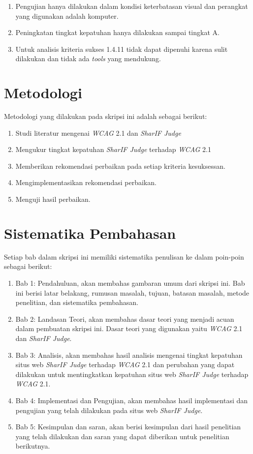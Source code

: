 \begin{enumerate}
	\item Pengujian hanya dilakukan dalam kondisi keterbatasan visual dan perangkat yang digunakan adalah komputer.
	\item Peningkatan tingkat kepatuhan hanya dilakukan sampai tingkat A.
	\item Untuk analisis kriteria sukses 1.4.11 tidak dapat dipenuhi karena sulit dilakukan dan tidak ada \textit{tools} yang mendukung.
\end{enumerate}

\section{Metodologi}
\label{sec:metlit}
Metodologi yang dilakukan pada skripsi ini adalah sebagai berikut:

\begin{enumerate}
	\item Studi literatur mengenai \textit{WCAG} 2.1 dan \textit{SharIF Judge}
	\item Mengukur tingkat kepatuhan \textit{SharIF Judge} terhadap \textit{WCAG} 2.1
	\item Memberikan rekomendasi perbaikan pada setiap kriteria kesuksessan.
	\item Mengimplementasikan rekomendasi perbaikan.
	\item Menguji hasil perbaikan.
\end{enumerate}

\section{Sistematika Pembahasan}
\label{sec:sispem}
Setiap bab dalam skripsi ini memiliki sistematika penulisan ke dalam poin-poin sebagai berikut:

\begin{enumerate}
	\item Bab 1: Pendahuluan, akan membahas gambaran umum dari skripsi ini. Bab ini berisi latar
	belakang, rumusan masalah, tujuan, batasan masalah, metode penelitian, dan sistematika
	pembahasan.
	\item Bab 2: Landasan Teori, akan membahas dasar teori yang menjadi acuan dalam pembuatan
	skripsi ini. Dasar teori yang digunakan yaitu \textit{WCAG} 2.1 dan \textit{SharIF Judge}.
	\item Bab 3: Analisis, akan membahas hasil analisis mengenai tingkat kepatuhan situs web \textit{SharIF Judge} terhadap \textit{WCAG} 2.1 dan perubahan yang dapat dilakukan untuk mentingkatkan kepatuhan situs web \textit{SharIF Judge} terhadap \textit{WCAG} 2.1.
	\item Bab 4: Implementasi dan Pengujian, akan membahas hasil implementasi dan pengujian yang
	telah dilakukan pada situs web \textit{SharIF Judge}.
	\item Bab 5: Kesimpulan dan saran, akan berisi kesimpulan dari hasil penelitian yang telah dilakukan dan saran yang dapat diberikan untuk penelitian berikutnya.
\end{enumerate}